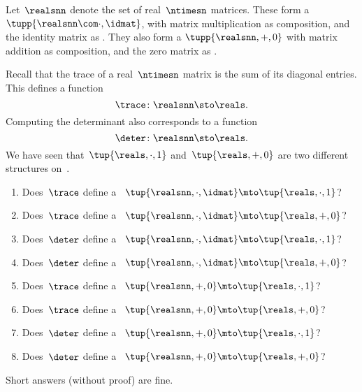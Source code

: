 \begin{gradedexercise}
    \label{ex:TraceAndDeterminant}
    Let~$\realsnn$ denote the set of real~$\ntimesn$ matrices.
    These form a ~$\tupp{\realsnn\com \cdot, \idmat}$, with matrix multiplication as composition, and the identity matrix as .
    They also form a  $\tupp{\realsnn, +, 0}$ with matrix addition as composition, and the zero matrix as .

    Recall that the trace of a real~$\ntimesn$ matrix is the sum of its diagonal entries.
    This defines a function
    \begin{equation}
        \trace \colon \realsnn \sto \reals.
    \end{equation}
    Computing the determinant also corresponds to a function
    \begin{equation}
        \deter \colon \realsnn \sto \reals.
    \end{equation}
    We have seen that~$\tup{ \reals, \cdot, 1}$ and~$\tup{ \reals, +, 0}$ are two different  structures on~\reals.
    \begin{enumerate}
        \item Does~$\trace$ define a ~$\tup{\realsnn, \cdot, \idmat} \mto \tup{ \reals, \cdot, 1}$?
        \item Does~$\trace$ define a ~$\tup{\realsnn, \cdot, \idmat} \mto \tup{ \reals, +, 0}$?
        \item Does~$\deter$ define a ~$\tup{\realsnn, \cdot, \idmat} \mto \tup{ \reals, \cdot, 1}$?
        \item Does~$\deter$ define a ~$\tup{\realsnn, \cdot, \idmat} \mto \tup{ \reals, +, 0}$?
        \item Does~$\trace$ define a ~$\tup{\realsnn, +, 0} \mto \tup{ \reals, \cdot, 1}$?
        \item Does~$\trace$ define a ~$\tup{\realsnn, +, 0} \mto \tup{ \reals, +, 0}$?
        \item Does~$\deter$ define a ~$\tup{\realsnn, +, 0} \mto \tup{ \reals, \cdot, 1}$?
        \item Does~$\deter$ define a ~$\tup{\realsnn, +, 0} \mto \tup{ \reals, +, 0}$?
    \end{enumerate}
    Short answers (without proof) are fine.
\end{gradedexercise}

